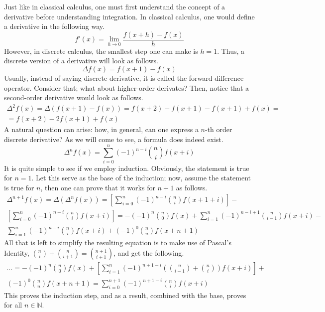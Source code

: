 \documentclass{article}
\begin{document}
Just like in classical calculus, one must first understand the concept of a derivative before understanding integration. In classical calculus, one would define a derivative in the following way.
\begin{equation}
	f'(x) = \lim_{h \rightarrow 0} \frac{f(x + h) - f(x)}{h}
\end{equation}
However, in discrete calculus, the smallest step one can make is \(h = 1\). Thus, a discrete version of a derivative will look as follows.
\begin{equation}
	\Delta f(x) = f(x + 1) - f(x)
\end{equation}
Usually, instead of saying discrete derivative, it is called the forward difference operator. Consider that; what about higher-order derivates? Then, notice that a second-order derivative would look as follows.
\begin{multline}
	\Delta^2 f(x) = \Delta (f(x + 1) - f(x)) = f(x + 2) - f(x + 1) - f(x + 1) + f(x) =
	\\ = f(x + 2) - 2f(x + 1) + f(x)
\end{multline}
A natural question can arise: how, in general, can one express a \(n\)-th order discrete derivative? As we will come to see, a formula does indeed exist.
\begin{equation}
	\Delta^n f(x) = \sum_{i = 0}^n (-1)^{n - i} \binom{n}{i} f(x + i)
\end{equation}
It is quite simple to see if we employ induction. Obviously, the statement is true for \(n = 1\). Let this serve as the base of the induction; now, assume the statement is true for \(n\), then one can prove that it works for \(n + 1\) as follows.
\begin{multline}
	\Delta^{n + 1} f(x) = \Delta(\Delta^n f(x)) = \left[ \sum_{i = 0}^n (-1)^{n - i} \binom{n}{i} f(x + 1 + i) \right] - \\
	\left[ \sum_{i = 0}^n (-1)^{n - i} \binom{n}{i} f(x + i) \right] =  - (-1)^{n} \binom{n}{0} f(x) + \sum_{i = 1}^{n}  (-1)^{n - i + 1} \binom{n}{i - 1} f(x + i) - \\
	\sum_{i = 1}^{n} (-1)^{n - i} \binom{n}{i} f(x + i) + (-1)^{0} \binom{n}{n} f(x + n + 1)
\end{multline}
All that is left to simplify the resulting equation is to make use of Pascal's Identity, \(\binom{n}{i} + \binom{n}{i + 1} = \binom{n +1}{i + 1}\), and get the following.
\begin{multline}
	... = - (-1)^{n} \binom{n}{0} f(x) + \left[ \sum_{i = 1}^n (-1)^{n + 1 - i} \left( \binom{n}{i - 1} + \binom{n}{i} \right) f(x + i) \right] + \\
	(-1)^{0} \binom{n}{n} f(x + n + 1) = \sum_{i = 0}^{n + 1} (-1)^{n + 1 - i} \binom{n}{i} f(x + i)
\end{multline}
This proves the induction step, and as a result, combined with the base, proves for all \(n \in \mathbb{N}\).
\end{document}
